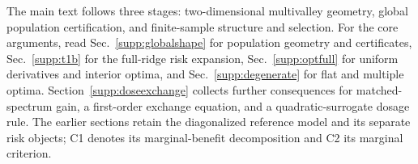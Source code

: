 
The main text follows three stages: two-dimensional multivalley geometry, global population certification, and finite-sample structure and selection. For the core arguments, read Sec.~\ref{supp:globalshape} for population geometry and certificates, Sec.~\ref{supp:t1b} for the full-ridge risk expansion, Sec.~\ref{supp:optfull} for uniform derivatives and interior optima, and Sec.~\ref{supp:degenerate} for flat and multiple optima. Section~\ref{supp:doseexchange} collects further consequences for matched-spectrum gain, a first-order exchange equation, and a quadratic-surrogate dosage rule. The earlier sections retain the diagonalized reference model and its separate risk objects; C1 denotes its marginal-benefit decomposition and C2 its marginal criterion.

